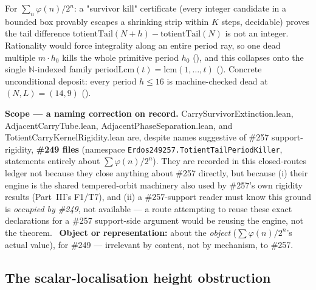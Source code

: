 \begin{prop}
\label{prop:carry-survivor-extinction}
For $\sum_n\varphi(n)/2^n$: a "survivor kill" certificate (every integer candidate in a bounded box
provably escapes a shrinking strip within $K$ steps, decidable) proves the tail difference
$\mathrm{totientTail}(N{+}h)-\mathrm{totientTail}(N)$ is not an integer. Rationality would force
integrality along an entire period ray, so one dead multiple $m\cdot h_0$ kills the whole primitive
period $h_0$
(),
and this collapses onto the single $\mathbb N$-indexed family $\mathrm{periodLcm}(t)=\mathrm{lcm}(1,\ldots,t)$
().
Concrete unconditional deposit: every period $h\le16$ is machine-checked dead at $(N,L)=(14,9)$
().

\textbf{Scope — a naming correction on record.} \textsf{CarrySurvivorExtinction.lean},
\textsf{AdjacentCarryTube.lean}, \textsf{AdjacentPhaseSeparation.lean}, and
\textsf{TotientCarryKernelRigidity.lean} are, despite names suggestive of \#257 support-rigidity,
\textbf{\#249 files} (namespace \texttt{Erdos249257.TotientTailPeriodKiller}, statements entirely
about $\sum\varphi(n)/2^n$). They are recorded in this closed-routes ledger not because they close
anything about \#257 directly, but because (i) their engine is the shared tempered-orbit machinery
also used by \#257's own rigidity results (Part~III's F1/T7), and (ii) a \#257-support reader must
know this ground is \emph{occupied by \#249}, not available — a route attempting to reuse these
exact declarations for a \#257 support-side argument would be reusing the engine, not the theorem.
\ \textbf{Object or representation:}
about the \emph{object} ($\sum\varphi(n)/2^n$'s actual value), for \#249 — irrelevant by content, not
by mechanism, to \#257.
\end{prop}

\subsection{The scalar-localisation height obstruction}


